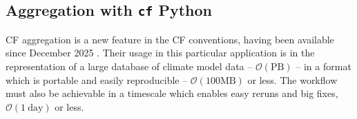 \documentclass[11pt,a4paper]{article}
\begin{document}
 
\subsection{Aggregation with \texttt{cf} Python}

CF aggregation is a new feature in the CF conventions, having been available since December 2025 \citep{eaton_2025_17801666}. Their usage in this particular application is in the representation of a large database of climate model data -- $\mathcal{O}(\mathrm{PB})$ -- in a format which is portable and easily reproducible -- $\mathcal{O}({100\mathrm{MB}})$ or less. The workflow must also be achievable in a timescale which enables easy reruns and big fixes, $\mathcal{O}(1~\mathrm{day})$ or less.

\begin{table}
\centering



\end{table}
\end{document}
